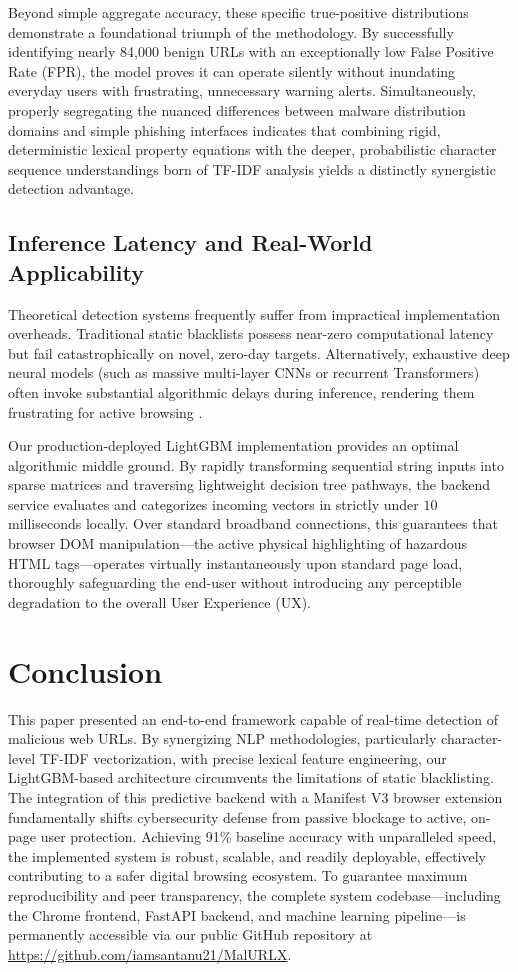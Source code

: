 \documentclass[conference]{IEEEtran}
\begin{document}
Beyond simple aggregate accuracy, these specific true-positive distributions demonstrate a foundational triumph of the methodology. By successfully identifying nearly 84,000 benign URLs with an exceptionally low False Positive Rate (FPR), the model proves it can operate silently without inundating everyday users with frustrating, unnecessary warning alerts. Simultaneously, properly segregating the nuanced differences between malware distribution domains and simple phishing interfaces indicates that combining rigid, deterministic lexical property equations with the deeper, probabilistic character sequence understandings born of TF-IDF analysis yields a distinctly synergistic detection advantage.

\subsection{Inference Latency and Real-World Applicability}
Theoretical detection systems frequently suffer from impractical implementation overheads. Traditional static blacklists possess near-zero computational latency but fail catastrophically on novel, zero-day targets. Alternatively, exhaustive deep neural models (such as massive multi-layer CNNs or recurrent Transformers) often invoke substantial algorithmic delays during inference, rendering them frustrating for active browsing \cite{arulmozhiselvan2025real}. 

Our production-deployed LightGBM implementation provides an optimal algorithmic middle ground. By rapidly transforming sequential string inputs into sparse matrices and traversing lightweight decision tree pathways, the backend service evaluates and categorizes incoming vectors in strictly under $10$ milliseconds locally. Over standard broadband connections, this guarantees that browser DOM manipulation—the active physical highlighting of hazardous HTML tags—operates virtually instantaneously upon standard page load, thoroughly safeguarding the end-user without introducing any perceptible degradation to the overall User Experience (UX).

\section{Conclusion}
This paper presented an end-to-end framework capable of real-time detection of malicious web URLs. By synergizing NLP methodologies, particularly character-level TF-IDF vectorization, with precise lexical feature engineering, our LightGBM-based architecture circumvents the limitations of static blacklisting. The integration of this predictive backend with a Manifest V3 browser extension fundamentally shifts cybersecurity defense from passive blockage to active, on-page user protection. Achieving 91\% baseline accuracy with unparalleled speed, the implemented system is robust, scalable, and readily deployable, effectively contributing to a safer digital browsing ecosystem. To guarantee maximum reproducibility and peer transparency, the complete system codebase—including the Chrome frontend, FastAPI backend, and machine learning pipeline—is permanently accessible via our public GitHub repository at \url{https://github.com/iamsantanu21/MalURLX}.
\end{document}
